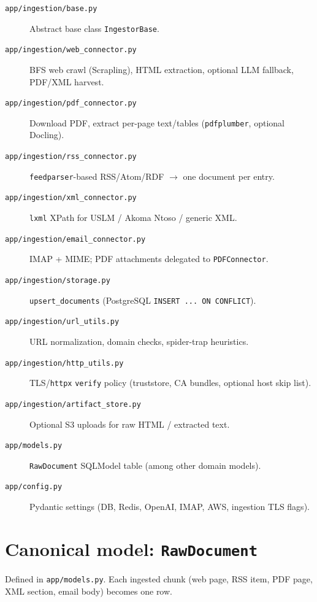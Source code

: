\documentclass[11pt,a4paper]{article}
\begin{document}
\begin{description}
  \item[\texttt{app/ingestion/base.py}] Abstract base class \texttt{IngestorBase}.
  \item[\texttt{app/ingestion/web\_connector.py}] BFS web crawl (Scrapling), HTML extraction, optional LLM fallback, PDF/XML harvest.
  \item[\texttt{app/ingestion/pdf\_connector.py}] Download PDF, extract per-page text/tables (\texttt{pdfplumber}, optional Docling).
  \item[\texttt{app/ingestion/rss\_connector.py}] \texttt{feedparser}-based RSS/Atom/RDF $\rightarrow$ one document per entry.
  \item[\texttt{app/ingestion/xml\_connector.py}] \texttt{lxml} XPath for USLM / Akoma Ntoso / generic XML.
  \item[\texttt{app/ingestion/email\_connector.py}] IMAP + MIME; PDF attachments delegated to \texttt{PDFConnector}.
  \item[\texttt{app/ingestion/storage.py}] \texttt{upsert\_documents} (PostgreSQL \texttt{INSERT ... ON CONFLICT}).
  \item[\texttt{app/ingestion/url\_utils.py}] URL normalization, domain checks, spider-trap heuristics.
  \item[\texttt{app/ingestion/http\_utils.py}] TLS/\texttt{httpx} \texttt{verify} policy (truststore, CA bundles, optional host skip list).
  \item[\texttt{app/ingestion/artifact\_store.py}] Optional S3 uploads for raw HTML / extracted text.
  \item[\texttt{app/models.py}] \texttt{RawDocument} SQLModel table (among other domain models).
  \item[\texttt{app/config.py}] Pydantic settings (DB, Redis, OpenAI, IMAP, AWS, ingestion TLS flags).
\end{description}

\section{Canonical model: \texttt{RawDocument}}

Defined in \texttt{app/models.py}. Each ingested chunk (web page, RSS item, PDF page, XML section, email body) becomes one row.
\end{document}
